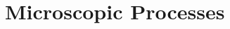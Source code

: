 
\addtocounter{part}{1}

\part[II]{Microscopic Processes}
\begin{frame}
  \partpage
  \tableofcontents[part=2]
\end{frame}



%
%
